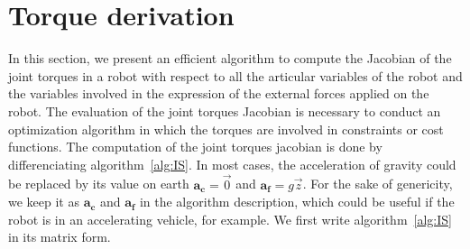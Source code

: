 


\section{Torque derivation}
\label{sec:torque_derivation}


In this section, we present an efficient algorithm to compute the Jacobian of the joint torques in a robot with respect to all the articular variables of the robot and the variables involved in the expression of the external forces applied on the robot.
The evaluation of the joint torques Jacobian is necessary to conduct an optimization algorithm in which the torques are involved in constraints or cost functions.
The computation of the joint torques jacobian is done by differenciating algorithm~\ref{alg:IS}.
In most cases, the acceleration of gravity could be replaced by its value on earth $\mathbf{a_c} = \vec{0}$ and $\mathbf{a_f} = g \vec{z}$.
For the sake of genericity, we keep it as $\mathbf{a_c}$ and $\mathbf{a_f}$ in the algorithm description, which could be useful if the robot is in an accelerating vehicle, for example.
We first write algorithm~\ref{alg:IS} in its matrix form.

